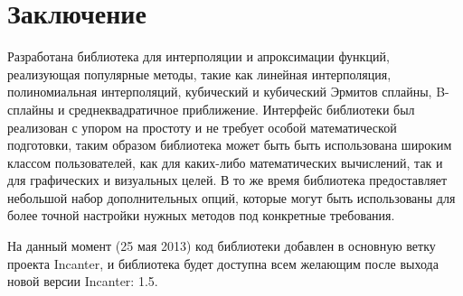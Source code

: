 \section{Заключение}

Разработана библиотека для интерполяции и апроксимации функций, реализующая популярные методы, такие как линейная интерполяция, полиномиальная интерполяций, кубический и кубический Эрмитов сплайны, B-сплайны и среднеквадратичное приближение. Интерфейс библиотеки был реализован с упором на простоту и не требует особой математической подготовки, таким образом библиотека может быть быть использована широким классом пользователей, как для каких-либо математических вычислений, так и для графических и визуальных целей. В то же время библиотека предоставляет небольшой набор дополнительных опций, которые могут быть использованы для более точной настройки нужных методов под конкретные требования.

На данный момент (25 мая 2013) код библиотеки добавлен в основную ветку проекта Incanter, и библиотека будет доступна всем желающим после выхода новой версии Incanter: 1.5.

